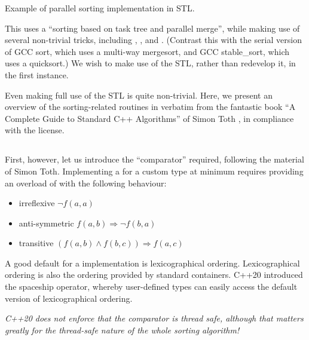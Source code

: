 \begin{codebox}[breakable]{}
\footnotesize Example of parallel sorting implementation in STL.
\tcblower
{}
\end{codebox}

This uses a ``sorting based on task tree and parallel merge'', while making use of several non-trivial tricks, including , , and . (Contrast this with the serial version of GCC sort, which uses a multi-way mergesort, and GCC stable\_sort, which uses a quicksort.) We wish to make use of the STL, rather than redevelop it, in the first instance. 


Even making full use of the STL is quite non-trivial. Here, we present an overview of the sorting-related routines in verbatim from the fantastic book ``A Complete Guide to Standard C++ Algorithms'' of Simon Toth \cite{toth2023}, in compliance with the license. 

\subsection{}

First, however, let us introduce the  ``comparator'' required, following the material of Simon Toth.
Implementing a  for a custom type at minimum requires providing an overload of  with the following behaviour:

\begin{itemize}
    \item irreflexive $\neg f(a,a)$
    \item anti-symmetric $f(a,b) \Rightarrow \neg f(b,a)$
    \item transitive $(f(a,b) \wedge f(b,c)) \Rightarrow f(a,c)$
\end{itemize}

A good default for a  implementation is lexicographical ordering. Lexicographical ordering is also the ordering provided by standard containers.
C++20 introduced the spaceship operator, whereby user-defined types can easily access the default version of lexicographical ordering.

\emph{C++20 does not enforce that the comparator is thread safe, although that matters greatly for the thread-safe nature of the whole sorting algorithm!}

